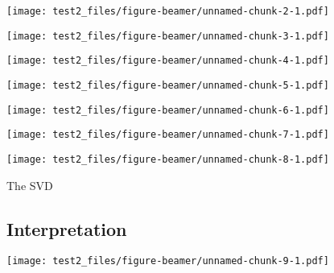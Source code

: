 \documentclass[
  ignorenonframetext,
]{beamer}
\begin{document}
\begin{frame}

\texttt{[image: test2\_files/figure-beamer/unnamed-chunk-2-1.pdf]}

\end{frame}

\begin{frame}

\texttt{[image: test2\_files/figure-beamer/unnamed-chunk-3-1.pdf]}

\end{frame}

\begin{frame}

\texttt{[image: test2\_files/figure-beamer/unnamed-chunk-4-1.pdf]}

\end{frame}

\begin{frame}

\texttt{[image: test2\_files/figure-beamer/unnamed-chunk-5-1.pdf]}

\end{frame}

\begin{frame}

\texttt{[image: test2\_files/figure-beamer/unnamed-chunk-6-1.pdf]}

\end{frame}

\begin{frame}

\texttt{[image: test2\_files/figure-beamer/unnamed-chunk-7-1.pdf]}

\end{frame}

\begin{frame}

\texttt{[image: test2\_files/figure-beamer/unnamed-chunk-8-1.pdf]}

\end{frame}

\begin{frame}{The SVD}
\protect\hypertarget{the-svd}{}

\end{frame}

\hypertarget{interpretation}{%
\subsection{Interpretation}\label{interpretation}}

\begin{frame}

\texttt{[image: test2\_files/figure-beamer/unnamed-chunk-9-1.pdf]}

\end{frame}
\end{document}
